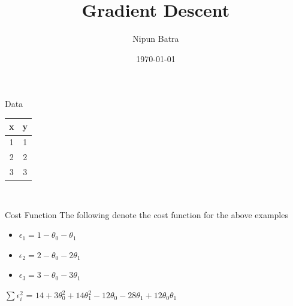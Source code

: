 \documentclass{beamer}
\title{Gradient Descent}
\date{\today}
\author{Nipun Batra}
\institute{IIT Gandhinagar}
\begin{document}
	\maketitle
	
	
	\begin{frame}{Data}
		
		\begin{center}
			\begin{tabular}{|c|c|}
				\hline
				\hline
				x&y  \\
				\hline
				1&1\\
				2&2\\
				3&3\\
				\hline
			\end{tabular}\\
			
		\end{center}
		
	\end{frame}
	
	
	\begin{frame}{Cost Function}
		The following denote the cost function for the above examples
		
		\begin{itemize}
			\item $\epsilon_{1} =1 -  \theta_{0} - \theta_{1}$
			\item $\epsilon_{2} =2 -  \theta_{0} - 2\theta_{1}$
			\item $\epsilon_{3} =3 -  \theta_{0} - 3\theta_{1}$
		\end{itemize}
		
		$\sum \epsilon_{i}^{2}$ = $14+3\theta_{0}^{2}+14\theta_{1}^{2}-12\theta_{0}-28\theta_{1}+12\theta_{0}\theta_{1}$
	\end{frame}
	
\end{document}
